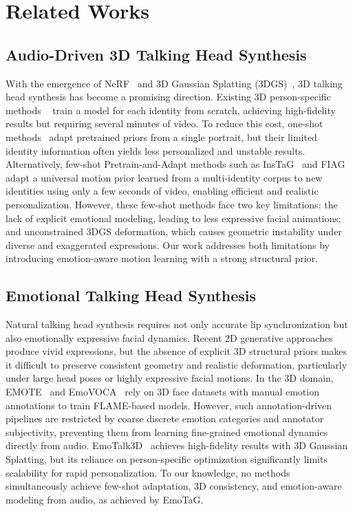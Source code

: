 \section{Related Works}
\label{sec:formatting}

\subsection{Audio-Driven 3D Talking Head Synthesis}
With the emergence of NeRF~\cite{mildenhall2021nerf} and 3D Gaussian Splatting (3DGS)~\cite{kerbl20233d}, 3D talking head synthesis has become a promising direction. Existing 3D person-specific methods ~\cite{li2024talkinggaussian, zhang2025fate, li2025rgbavatar, hou2022face, hou2021towards} train a model for each identity from scratch, achieving high-fidelity results but requiring several minutes of video. To reduce this cost, one-shot methods~\cite{ye2024real3d, hu2025ggtalker, tan2025fixtalk} adapt pretrained priors from a single portrait, but their limited identity information often yields less personalized and unstable results. Alternatively, few-shot Pretrain-and-Adapt methods such as InsTaG~\cite{li2025instag} and FIAG~\cite{nie2025few} adapt a universal motion prior learned from a multi-identity corpus to new identities using only a few seconds of video, enabling efficient and realistic personalization. However, these few-shot methods face two key limitations: the lack of explicit emotional modeling, leading to less expressive facial animations; and unconstrained 3DGS deformation, which causes geometric instability under diverse and exaggerated expressions. Our work addresses both limitations by introducing emotion-aware motion learning with a strong structural prior.

\subsection{Emotional Talking Head Synthesis}
Natural talking head synthesis requires not only accurate lip synchronization but also emotionally expressive facial dynamics. Recent 2D generative approaches~\cite{tan2023emmn, tan2024edtalk, zakharov2019few, xu2024hallo, tan2024flowvqtalker, tan2025disentangle, tan2025edtalk++} produce vivid expressions, but the absence of explicit 3D structural priors makes it difficult to preserve consistent geometry and realistic deformation, particularly under large head poses or highly expressive facial motions. In the 3D domain, EMOTE~\cite{danvevcek2023emotional} and EmoVOCA~\cite{nocentini2025emovoca} rely on 3D face datasets with manual emotion annotations to train FLAME-based models. However, such annotation-driven pipelines are restricted by coarse discrete emotion categories and annotator subjectivity, preventing them from learning fine-grained emotional dynamics directly from audio. EmoTalk3D~\cite{he2024emotalk3d} achieves high-fidelity results with 3D Gaussian Splatting, but its reliance on person-specific optimization significantly limits scalability for rapid personalization. To our knowledge, no methods simultaneously achieve few-shot adaptation, 3D consistency, and emotion-aware modeling from audio, as achieved by EmoTaG.
